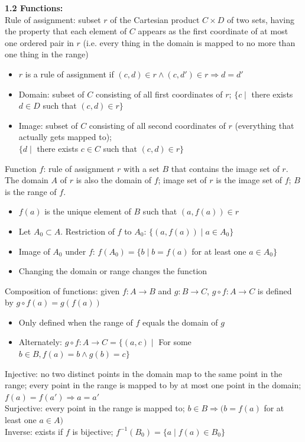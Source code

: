 \documentclass{article}
\begin{document}
\textbf{1.2 Functions:}\\
Rule of assignment: subset $r$ of the Cartesian product $C \times D$ of two sets, having the property that each element of $C$ appears as the first coordinate of at most one ordered pair in $r$ (i.e. every thing in the domain is mapped to no more than one thing in the range)
\begin{itemize}
    \item $r$ is a rule of assignment if $(c, d) \in r \land (c, d') \in r \Rightarrow d=d'$
    \item Domain: subset of $C$ consisting of all first coordinates of $r$; $\{c \mid$ there exists $d\in D$ such that $(c, d) \in r\}$
    \item Image: subset of $C$ consisting of all second coordinates of $r$ (everything that actually gets mapped to); \\$\{d \mid$ there exists $c\in C$ such that $(c, d) \in r\}$
\end{itemize}
Function $f$: rule of assignment $r$ with a set $B$ that contains the image set of $r$. The domain $A$ of $r$ is also the domain of $f$; image set of $r$ is the image set of $f$; $B$ is the range of $f$.
\begin{itemize}
    \item $f(a)$ is the unique element of $B$ such that $(a, f(a)) \in r$
    \item Let $A_{0} \subset A$. Restriction of $f$ to $A_{0}$: $\{(a, f(a)) \mid a \in A_{0}\}$
    \item Image of $A_{0}$ under $f$: $f(A_{0}) = \{b \mid b = f(a)$ for at least one $a \in A_{0}\}$
    \item Changing the domain or range changes the function
\end{itemize}
Composition of functions: given $f:A \to B$ and $g:B \to C$, $g \circ f:A \to C$ is defined by $g \circ f (a) = g(f(a))$ 
\begin{itemize}
    \item Only defined when the range of $f$ equals the domain of $g$
    \item Alternately: $g \circ f : A \to C = \{(a, c) \mid$ For some $b \in B, f(a) = b \land g(b) = c\}$
\end{itemize}
Injective: no two distinct points in the domain map to the same point in the range; every point in the range is mapped to by at most one point in the domain; $f(a) = f(a') \Rightarrow a = a'$\\
Surjective: every point in the range is mapped to; $b \in B \Rightarrow (b = f(a)$ for at least one $a \in A)$\\
Inverse: exists if $f$ is bijective; $f^{-1}(B_{0}) = \{a \mid f(a) \in B_{0}\}$\\
\end{document}
